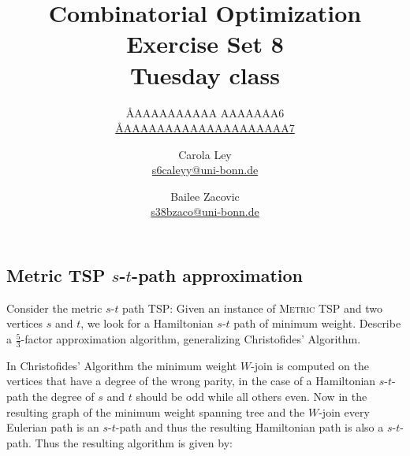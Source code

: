 \documentclass{article}
\title{Combinatorial Optimization \\ Exercise Set 8 \\ Tuesday class}
\author{
  \AA{AAAAAAAAAA AAAAAAA}{6} \\
  \href{mailto:\AA{AAAAAAAAAAAAAAAAAAAA}{7}}{\AA{AAAAAAAAAAAAAAAAAAAA}{7}}
  \and
  Carola Ley \\
  \href{mailto:s6caleyy@uni-bonn.de}{s6caleyy@uni-bonn.de}
  \and
  Bailee Zacovic \\
  \href{mailto:s38bzaco@uni-bonn.de}{s38bzaco@uni-bonn.de}
}
\begin{document}
  \maketitle

  \setcounter{section}{8}
  \subsection{Metric TSP $s$-$t$-path approximation}
  \begin{centerframebox}
    Consider the metric $s$-$t$ path TSP: Given an instance of \textsc{Metric TSP}
    and two vertices $s$ and $t$, we look for a Hamiltonian $s$-$t$ path of minimum
    weight. Describe a $\frac{5}{3}$-factor approximation algorithm, generalizing Christofides'
    Algorithm.
  \end{centerframebox}
  In Christofides' Algorithm  the minimum weight $W$-join is computed on the vertices that have a degree of the wrong parity, in the case of a Hamiltonian $s$-$t$-path the degree of $s$ and $t$ should be odd while all others even. Now in the resulting graph of the minimum weight spanning tree and the $W$-join every Eulerian path is an $s$-$t$-path and thus the resulting Hamiltonian path is also a $s$-$t$-path. Thus the resulting algorithm is given by:
\end{document}
